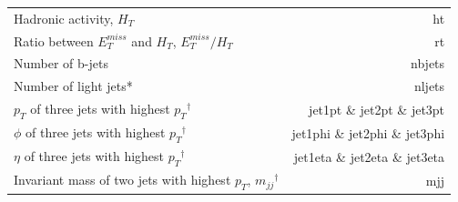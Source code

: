 \documentclass[14pt, a4paper]{book}
\begin{document}
\begin{table}[!h]
\begin{tabular}{l|r}
        Hadronic activity, $H_T$                                                        & ht\\
        Ratio between $E_T^{miss}$ and $H_T$, $E_T^{miss}/H_T$                          & rt\\
        Number of b-jets                                                                & nbjets         \\
        Number of light jets*                                                           & nljets         \\
        $p_T$ of three jets with highest $p_T$$^\dagger$                                & jet1pt \& jet2pt \& jet3pt\\
        $\phi$ of three jets with highest $p_T$$^\dagger$                               & jet1phi \& jet2phi \& jet3phi\\
        $\eta$ of three jets with highest $p_T$$^\dagger$                               & jet1eta \& jet2eta \& jet3eta\\
        Invariant mass of two jets with highest $p_T$, $m_{jj}$$^\dagger$               & mjj\\\midrule\midrule
    \end{tabular}
    \label{tab:variables}
\end{table}
\end{document}
